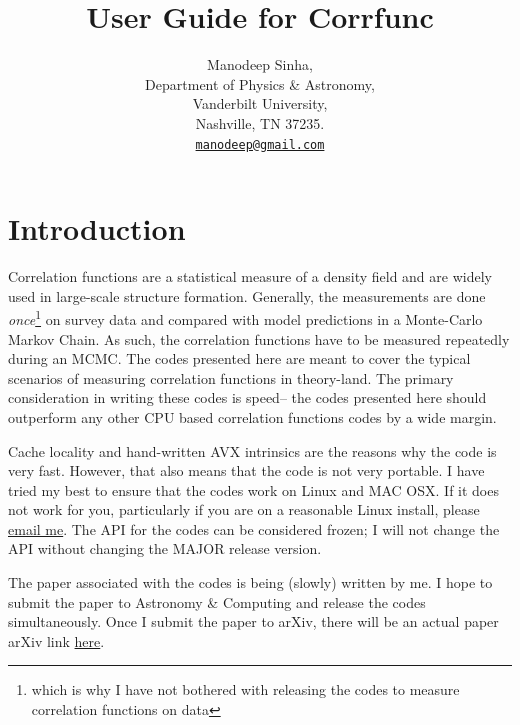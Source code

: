 \documentclass[12pt,titlepage,justified]{article}
\begin{document}
\title{User Guide for Corrfunc}
\author{Manodeep Sinha, \\
  Department of Physics \& Astronomy,\\
  Vanderbilt University,\\
  Nashville, TN 37235.\\
  \href{mailto:manodeep@gmail.com}{\texttt{manodeep@gmail.com}}
}

\maketitle 

\tableofcontents
{}

\section{Introduction}
Correlation functions are a statistical measure of a density field and are widely used in large-scale structure formation. Generally, 
the measurements are done {\em once}\footnote{which is why I have not bothered with releasing the codes to measure correlation 
functions on data} on survey data and compared with model predictions in a Monte-Carlo Markov Chain. As such, the 
correlation functions have to be measured repeatedly during an MCMC. The codes presented here are meant to cover the typical scenarios 
of measuring correlation functions in theory-land. The primary consideration in writing these codes is speed\footnotemark -- the codes 
presented here should outperform any other CPU based correlation functions codes by a wide margin. 

Cache locality and hand-written AVX intrinsics are the reasons why the code is very fast. However, that also means that the code is 
not very portable. I have tried my best to ensure that the codes work on Linux and MAC OSX. If it does not work for you, particularly 
if you are on a reasonable Linux install, please \href{mailto:manodeep@gmail.com}{email me}. The API for the codes can be considered 
frozen; I will not change the API without changing the MAJOR release version. 

The paper associated with the codes is being (slowly) written by me. I hope to submit the paper to Astronomy \& Computing and release 
the codes simultaneously. Once I submit the paper to arXiv, there will be an actual paper arXiv link \href{http://adsabs.harvard.edu/abs/2014arXiv1405.5832L}{here}.
\end{document}
